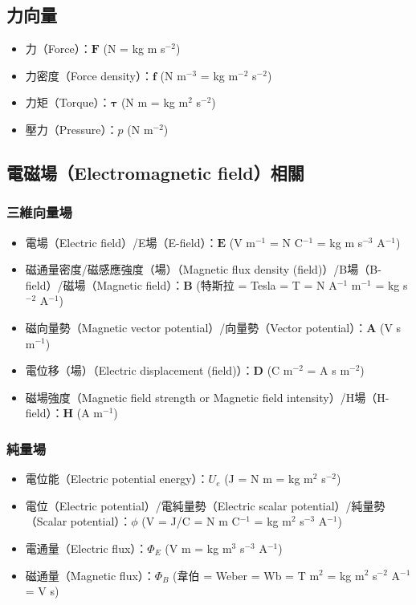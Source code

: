 \documentclass[a4paper,12pt]{report}
\begin{document}
\begin{itemize}
\subsection{力向量}
\begin{itemize}
\item 力（Force）：$\mathbf{F}$ (N = kg m s$^{-2}$)
\item 力密度（Force density）：$\mathbf{f}$ (N m$^{-3}$ = kg m$^{-2}$ s$^{-2}$)
\item 力矩（Torque）：$\boldsymbol{\tau}$ (N m = kg m$^2$ s$^{-2}$)
\item 壓力（Pressure）：$p$ (N m$^{-2}$)
\end{itemize}
\subsection{電磁場（Electromagnetic field）相關}
\subsubsection{三維向量場}
\begin{itemize}
\item 電場（Electric field）/E場（E-field）：$\mathbf{E}$ (V m$^{-1}$ = N C$^{-1}$ = kg m s$^{-3}$ A$^{-1}$)
\item 磁通量密度/磁感應強度（場）（Magnetic flux density (field)）/B場（B-field）/磁場（Magnetic field）：$\mathbf{B}$ (特斯拉 = Tesla = T = N A$^{-1}$ m$^{-1}$ = kg s$^{-2}$ A$^{-1}$)
\item 磁向量勢（Magnetic vector potential）/向量勢（Vector potential）：$\mathbf{A}$ (V s m$^{-1}$)
\item 電位移（場）（Electric displacement (field)）：$\mathbf{D}$ (C m$^{-2}$ = A s m$^{-2}$)
\item 磁場強度（Magnetic field strength or Magnetic field intensity）/H場（H-field）：$\mathbf{H}$ (A m$^{-1}$)
\end{itemize}
\subsubsection{純量場}
\begin{itemize}
\item 電位能（Electric potential energy）：$U_e$ (J = N m = kg m$^2$ s$^{-2}$)
\item 電位（Electric potential）/電純量勢（Electric scalar potential）/純量勢（Scalar potential）：$\phi$ (V = J/C = N m C$^{-1}$ = kg m$^2$ s$^{-3}$ A$^{-1}$)
\item 電通量（Electric flux）：$\Phi_E$ (V m = kg m$^3$ s$^{-3}$ A$^{-1}$)
\item 磁通量（Magnetic flux）：$\Phi_B$ (韋伯 = Weber = Wb = T m$^2$ = kg m$^2$ s$^{-2}$ A$^{-1}$ = V s)
\end{itemize}

\end{itemize}
\end{document}
